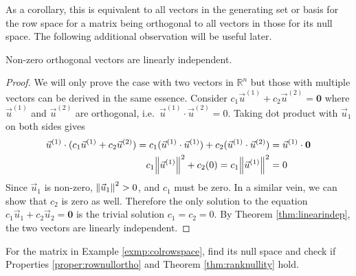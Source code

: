 As a corollary, this is equivalent to all vectors in the generating set or basis for the row space for a matrix being orthogonal to all vectors in those for its null space. The following additional observation will be useful later.
\begin{proper}
\label{proper:ortholinind}
Non-zero orthogonal vectors are linearly independent.
\end{proper}
\begin{proof}
We will only prove the case with two vectors in $\mathbb{R}^n$ but those with multiple vectors can be derived in the same essence. Consider $c_1\vec{u}^{(1)} + c_2\vec{u}^{(2)} = \textbf{0}$ where $\vec{u}^{(1)}$ and $\vec{u}^{(2)}$ are orthogonal, i.e.\ $\vec{u}^{(1)} \cdot \vec{u}^{(2)} = 0$. Taking dot product with $\vec{u}_1$ on both sides gives
\begin{align*}
\vec{u}^{(1)} \cdot (c_1\vec{u}^{(1)} + c_2\vec{u}^{(2)}) = c_1(\vec{u}^{(1)} \cdot \vec{u}^{(1)}) + c_2(\vec{u}^{(1)} \cdot \vec{u}^{(2)}) &= \vec{u}^{(1)} \cdot \textbf{0} \\
c_1 \norm{\vec{u}^{(1)}}^2 + c_2 (0) = c_1 \norm{\vec{u}^{(1)}}^2 &= 0
\end{align*}
Since $\vec{u}_1$ is non-zero, $\norm{\vec{u}_1}^2 > 0$, and $c_1$ must be zero. In a similar vein, we can show that $c_2$ is zero as well. Therefore the only solution to the equation $c_1\vec{u}_1 + c_2\vec{u}_2 = \textbf{0}$ is the trivial solution $c_1 = c_2 = 0$. By Theorem \ref{thm:linearindep}, the two vectors are linearly independent.
\end{proof}
\begin{exmp}
\label{exmp:colrowspace2}
For the matrix in Example \ref{exmp:colrowspace}, find its null space and check if Properties \ref{proper:rownullortho} and Theorem \ref{thm:ranknullity} hold.
\end{exmp}

